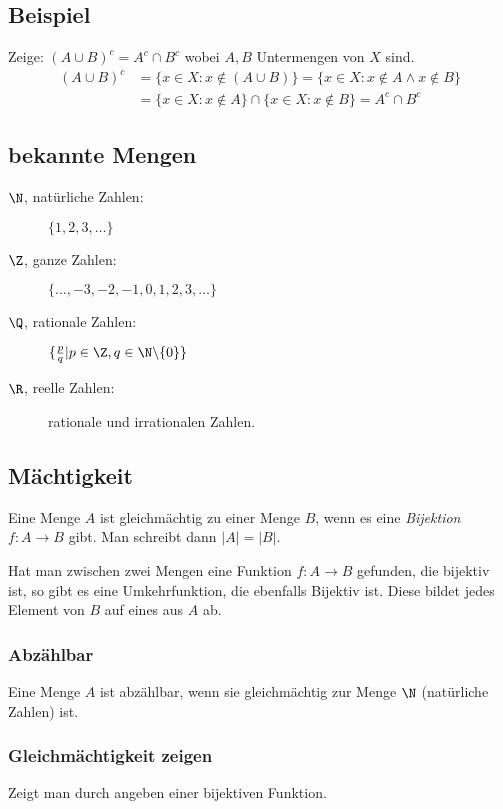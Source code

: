 \subsection*{Beispiel}
Zeige: $(A \cup B)^c = A^c \cap B^c$ wobei $A, B$ Untermengen von $X$ sind.
\begin{align*}
(A \cup B)^c &= \{x \in X: x \not\in (A \cup B)\} = \{x \in X: x \not\in A \land x \not\in B\}\\
&= \{x \in X: x \not\in A\} \cap \{x \in X: x \not\in B\} = A^c \cap B^c
\end{align*}

\subsection{bekannte Mengen}
\begin{description}
	\item[$\N$, natürliche Zahlen:] $\{1, 2, 3, \ldots\}$
	\item[$\Z$, ganze Zahlen:] $\{\ldots, -3, -2, -1, 0, 1, 2, 3, \ldots\}$
	\item[$\Q$, rationale Zahlen:] $\{\frac{p}{q} | p \in \Z, q \in \N \backslash \{0\}\}$
	\item[$\R$, reelle Zahlen:] rationale und irrationalen Zahlen.
\end{description}

\subsection{Mächtigkeit}
Eine Menge $A$ ist gleichmächtig zu einer Menge $B$, wenn es eine \textit{Bijektion}
$f: A \rightarrow B$ gibt. Man schreibt dann $|A| = |B|$.

Hat man zwischen zwei Mengen eine Funktion $f: A \rightarrow B$ gefunden, die bijektiv ist,
so gibt es eine Umkehrfunktion, die ebenfalls Bijektiv ist. Diese bildet jedes Element von $B$
auf eines aus $A$ ab.

\subsubsection{Abzählbar}
Eine Menge $A$ ist abzählbar, wenn sie gleichmächtig zur Menge $\N$ (natürliche Zahlen) ist.

\subsubsection{Gleichmächtigkeit zeigen}
Zeigt man durch angeben einer bijektiven Funktion.

